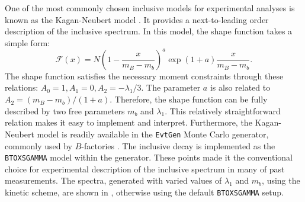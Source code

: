 One of the most commonly chosen inclusive \BtoXsgamma models for experimental analyses is known as the Kagan-Neubert model \cite{Kagan:1998ym}.
It provides a next-to-leading order description of the inclusive \BtoXsgamma spectrum. 
In this model, the shape function takes a simple form:
\begin{equation}
    \mathcal{F}(x) = N\left(1-\frac{x}{m_B-m_b}\right)^a\exp{(1+a)\frac{x}{m_B-m_b}}.
\end{equation}
The shape function satisfies the necessary moment constraints through these relations: $A_0=1,A_1 = 0,A_2=-\lambda_1/3$.
The parameter $a$ is also related to $A_2=(m_B-m_b)/(1+a)$.
Therefore, the shape function can be fully described by two free parameters $m_b$ and $\lambda_1$.
This relatively straightforward relation makes it easy to implement and interpret.
Furthermore, the Kagan-Neubert model is readily available in the \texttt{EvtGen} Monte Carlo generator, commonly used by $B$-factories \cite{Ryd:2005zz}.
The \BtoXsgamma inclusive decay is implemented as the \texttt{BTOXSGAMMA} model within the generator. 
These points made it the conventional choice for experimental description of the inclusive \Egamma spectrum in many of past measurements.
The spectra, generated with varied values of $\lambda_1$ and $m_b$, using the kinetic scheme, are shown in , otherwise using the default \texttt{BTOXSGAMMA} setup.
